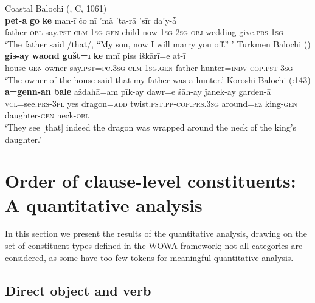 \documentclass[output=paper,colorlinks,citecolor=brown,draftmode]{langscibook}
\begin{document}
\ea\label{Balochi:ex:11}
\ea\label{Balochi:ex:11a}
Coastal Balochi (\citealt{nourzaei_balochi_coastal_2021}, C, 1061)\\
\gll \textbf{pet-ā} \textbf{go} \textbf{ke} man-ī čo nī 'mã 'ta-rā 'sīr da'y-ẫ \\
father-\textsc{obl} say.\textsc{pst} \textsc{clm} \textsc{1sg}-\textsc{gen} child now \textsc{1sg} \textsc{2sg}-\textsc{obj} wedding give.\textsc{prs}-\textsc{1sg} \\
\glt `{T}he father said /that/, ``My son, now I will marry you off.'' '
\ex\label{Balochi:ex:11b}
Turkmen Balochi (\citealt{axenov_balochi_2006})\\
\gll \textbf{gis-ay} \textbf{wāond} \textbf{gušt=ī} \textbf{ke} mnī piss iškārī=e at-ī \\
house-\textsc{gen} owner say.\textsc{pst}=\textsc{pc}.\textsc{3sg} \textsc{clm} \textsc{1sg}.\textsc{gen} father hunter=\textsc{indv} \textsc{cop}.\textsc{pst}-\textsc{3sg} \\
\glt `{T}he owner of the house said that my father was a hunter.'
\ex\label{Balochi:ex:11c}
Koroshi Balochi (\citealt{nourzaei_koroshi_2015}:143)\\
\gll \textbf{a=genn-an} \textbf{bale} aždahā=am pīk-ay dawr=e šāh-ay ǰanek-ay garden-ā \\
\textsc{vcl}=see.\textsc{prs}-\textsc{3pl} yes dragon=\textsc{add} twist.\textsc{pst.pp}-\textsc{cop}.\textsc{prs}.\textsc{3sg} around=\textsc{ez} king-\textsc{gen} daughter-\textsc{gen} neck-\textsc{obl} \\
\glt `{T}hey see [that] indeed the dragon was wrapped around the neck of the king's daughter.' 
\z
\z

\section{Order of clause-level constituents: A quantitative analysis}\label{Balochi:ss:4}

In this section we present the results of the quantitative analysis, drawing on the set of constituent types defined in the WOWA framework; not all categories are considered, as some have too few tokens for meaningful quantitative analysis.

\subsection{Direct object and verb}\label{Balochi:ss:4.1}
\end{document}
